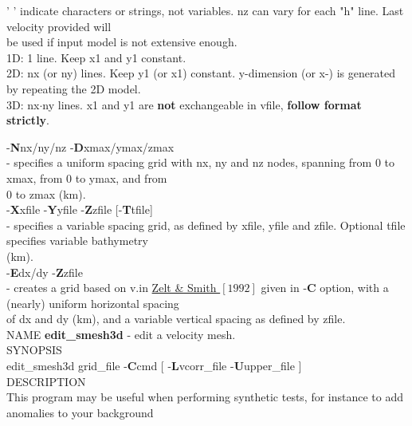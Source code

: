 \documentclass[twoside,final,onecolumn]{article}
\newcommand{\forceindent}{\leavevmode{\parindent=1em\indent}}
\begin{document}
\forceindent\forceindent ' ' indicate characters or strings, not variables. nz can vary for each "h" line.
Last velocity provided will \\ 
\forceindent\forceindent be used if input model is not extensive enough.\\
\newline
\forceindent\forceindent 1D: 1 line. Keep x1 and y1 constant.\\
\forceindent\forceindent 2D: nx (or ny) lines. Keep y1 (or x1) constant. y-dimension (or x-) is generated by repeating the 2D model.\\
\forceindent\forceindent 3D: nx$\cdot$ny lines. x1 and y1 are \textbf{not} exchangeable in vfile, \textbf{follow format strictly}.

\forceindent -\textbf{N}nx/ny/nz -\textbf{D}xmax/ymax/zmax \\
\forceindent\forceindent - specifies a uniform spacing grid with nx, ny and nz nodes, spanning from 0 to xmax, from 0 to ymax, and from \\
\forceindent\forceindent 0 to zmax (km).\\[6pt]
\forceindent -\textbf{X}xfile -\textbf{Y}yfile -\textbf{Z}zfile [-\textbf{T}tfile] \\
\forceindent\forceindent  - specifies a variable spacing grid, as defined by xfile, yfile and zfile. Optional tfile specifies variable bathymetry\\
\forceindent\forceindent  (km).\\[6pt]
\forceindent -\textbf{E}dx/dy -\textbf{Z}zfile \\
\forceindent\forceindent - creates a grid based on v.in \href{http://www.dx.doi.org/10.1111/j.1365-246X.1992.tb00836.x}{Zelt \& Smith $[1992]$} given in -\textbf{C} option, with a (nearly) uniform horizontal spacing \\
\forceindent\forceindent of dx and dy (km), and a variable vertical spacing as defined by zfile.\\[6pt]
\newline
\newline
NAME \textbf{edit\_smesh3d} - edit a velocity mesh.\\[6pt]
SYNOPSIS \\
\forceindent edit\_smesh3d grid\_file -\textbf{C}cmd [ -\textbf{L}vcorr\_file -\textbf{U}upper\_file ]\\[6pt]
DESCRIPTION \\
\forceindent This program may be useful when performing synthetic tests, for instance to add anomalies to your background\\
\end{document}
